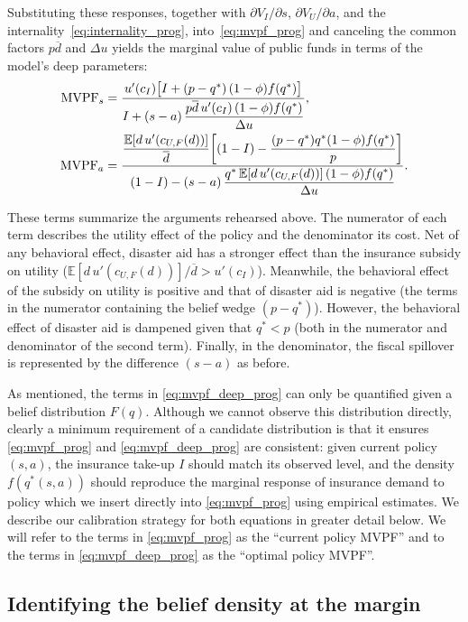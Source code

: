 \documentclass[12pt]{article}
\begin{document}
Substituting these responses, together with $\partial V_I/\partial s$, $\partial V_U/\partial a$, and the internality~\eqref{eq:internality_prog}, into~\eqref{eq:mvpf_prog} and canceling the common factors $p\overline{d}$ and $\Delta u$ yields the marginal value of public funds in terms of the model's deep parameters:
\begin{align}
    \text{MVPF}_s &= \frac{u'(c_I)\bigl[I + (p-q^*)\,(1-\phi)f(q^*)\bigr]}{I + (s-a)\,\dfrac{p\overline{d}\,u'(c_I)\,(1-\phi)f(q^*)}{\Delta u}}, \notag \\
    \text{MVPF}_a &= \frac{\dfrac{\mathbb{E}[d\,u'(c_{U,F}(d))]}{\overline{d}} \! \left[(1-I) - \dfrac{(p-q^*)q^*(1-\phi)f(q^*)}{p}\right]}{(1-I) - (s-a)\,\dfrac{q^*\,\mathbb{E}[d\,u'(c_{U,F}(d))]\,(1-\phi)f(q^*)}{\Delta u}}. \label{eq:mvpf_deep_prog}
\end{align}

These terms summarize the arguments rehearsed above. The numerator of each term describes the utility effect of the policy and the denominator its cost. Net of any behavioral effect, disaster aid has a stronger effect than the insurance subsidy on utility ($\mathbb{E}[d\,u'(c_{U,F}(d))]/\overline{d}>u'(c_I)$). Meanwhile, the behavioral effect of the subsidy on utility is positive and that of disaster aid is negative (the terms in the numerator containing the belief wedge $(p-q^*)$). However, the behavioral effect of disaster aid is dampened given that $q^*<p$ (both in the numerator and denominator of the second term). Finally, in the denominator, the fiscal spillover is represented by the difference $(s-a)$ as before. 

As mentioned, the terms in \eqref{eq:mvpf_deep_prog} can only be quantified given a belief distribution $F(q)$. Although we cannot observe this distribution directly, clearly a minimum requirement of a candidate distribution is that it ensures \eqref{eq:mvpf_prog} and \eqref{eq:mvpf_deep_prog} are consistent: given current policy $(s,a)$, the insurance take-up $I$ should match its observed level, and the density $f(q^*(s,a))$ should reproduce the marginal response of insurance demand to policy which we insert directly into \eqref{eq:mvpf_prog} using empirical estimates. We describe our calibration strategy for both equations in greater detail below. We will refer to the terms in \eqref{eq:mvpf_prog} as the ``current policy MVPF'' and to the terms in \eqref{eq:mvpf_deep_prog} as the ``optimal policy MVPF''. 

\subsection{Identifying the belief density at the margin}\label{subsec:fqstar}
\end{document}
